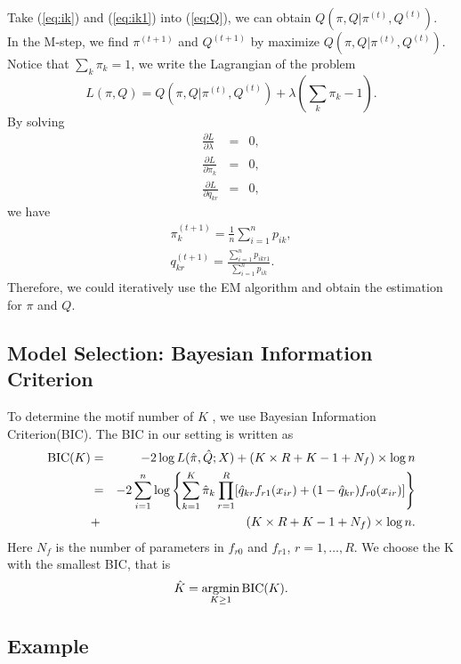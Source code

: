\documentclass[11pt, oneside]{article}   	%
\DeclareMathOperator*{\argmin}{argmin}
\begin{document}
Take (\ref{eq:ik}) and (\ref{eq:ik1}) into (\ref{eq:Q}), we can obtain $Q(\pi,Q|\pi^{(t)}, Q^ {(t)})$. \\

In the M-step, we find $\pi^{(t+1)}$ and $Q^ {(t+1)}$ by maximize $Q(\pi,Q|\pi^{(t)}, Q^ {(t)})$. Notice that $\sum_k \pi_k=1$, we write the Lagrangian of the problem
\begin{equation*}
L(\pi,Q) = Q(\pi,Q|\pi^{(t)}, Q^ {(t)})+ \lambda(\sum_k \pi_k-1).
\end{equation*}
By solving
\begin{eqnarray*}
\frac{\partial L}{\partial \lambda} &=&0, \\
\frac{\partial L}{\partial \pi_k} &=&0, \\
\frac{\partial L}{\partial q_{kr}} &=& 0,
\end{eqnarray*}
we have
\begin{eqnarray}
\pi_k^{(t+1)} = \frac{1}{n} \sum_{i=1}^n p_{ik}, \\
q_{kr}^ {(t+1)}=\frac{\sum_{i=1}^n p_{ikr1}}{\sum_{i=1}^n p_{ik}}.
\end{eqnarray}
Therefore, we could iteratively use the EM algorithm and obtain the estimation for $\pi$ and $Q$.

\subsection{Model Selection: Bayesian Information Criterion}

To determine the motif number of $K$ , we use Bayesian Information Criterion(BIC). The BIC in our setting is written as 
\begin{eqnarray}
{\rm BIC}(K) &=& -2\log L(\hat \pi,\hat Q;X) + (K\times R+K-1+N_f)\times \log n \nonumber \\
&=& -2 \sum_{i=1}^n \log \left \{  \sum_{k=1}^K \hat \pi_k\prod_{r=1}^R [\hat q_{kr}f_{r1}(x_{ir})+(1-\hat q_{kr})f_{r0}(x_{ir})]   \right \} \nonumber\\
&+& (K\times R+K-1+N_f)\times \log n.
\end{eqnarray}
Here $N_f$ is the number of parameters in $f_{r0}$ and $f_{r1}$, $r = 1,\ldots, R$. We choose the K with the smallest BIC, that is 
\begin{equation}
\hat K = \argmin_{K\geq1} {\rm BIC}(K).
\end{equation}

\subsection{Example}
\end{document}
